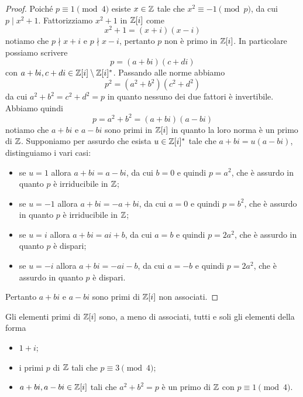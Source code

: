 \documentclass[11pt]{scrartcl}
\begin{document}
	\begin{proof}
		Poiché $p \equiv 1 \pmod 4$ esiste $x \in \mathbb Z$ tale che $x^2 \equiv -1 \pmod p$,
		da cui $p \mid x^2 + 1$. Fattorizziamo $x^2 + 1$ in $\mathbb Z[i]$ come 
		\[
		x^2 + 1 = (x + i)(x - i)
		\]
		notiamo che $p\nmid x + i$ e $p \nmid x - i$, pertanto $p$ non è primo in $\mathbb Z[i]$.
		In particolare possiamo scrivere 
		\[
		p = (a + bi)(c + di)
		\]
		con $a + bi, c + di \in \mathbb Z[i] \setminus \mathbb Z[i]^*$. Passando alle norme 
		abbiamo
		\[
		p^2 = (a^2 + b^2)(c^2 + d^2)
		\]
		da cui $a^2 + b^2 = c^2 + d^2 = p$ in quanto nessuno dei due fattori è 
		invertibile. Abbiamo quindi 
		\[
		p = a^2 + b^2 = (a + bi)(a - bi)
		\]
		notiamo che $a + bi$ e $a - bi$ sono primi in $\mathbb Z[i]$ in quanto la loro 
		norma è un primo di $\mathbb Z$. Supponiamo per assurdo che esista $u \in \mathbb Z[i]^*$
		tale che $a + bi = u(a - bi)$, distinguiamo i vari casi:
		\begin{itemize}
			\item se $u = 1$ allora $a + bi = a - bi$, da cui $b = 0$ e quindi $p = a^2$,
			che è assurdo in quanto $p$ è irriducibile in $\mathbb Z$;
			\item se $u = -1$ allora $a + bi = -a + bi$, da cui $a = 0$ e quindi
			$p = b^2$, che è assurdo in quanto $p$ è irriducibile in $\mathbb Z$;
			\item se $u = i$ allora $a + bi = ai + b$, da cui $a = b$ e quindi $p = 
			2a^2$, che è assurdo in quanto $p$ è dispari;
			\item se $u = -i$ allora $a + bi = -ai - b$, da cui $a = -b$ e quindi
			$p = 2a^2$, che è assurdo in quanto $p$ è dispari.
		\end{itemize}
		Pertanto $a + bi$ e $a - bi$ sono primi di $\mathbb Z[i]$ non associati.
	\end{proof}
	
	\begin{proposition}
		Gli elementi primi di $\mathbb Z[i]$ sono, a meno di associati, tutti e soli
		gli elementi della forma
		\begin{itemize}
			\item $1 + i$;
			\item i primi $p$ di $\mathbb Z$ tali che $p \equiv 3 \pmod 4$;
			\item $a + bi, a - bi \in \mathbb Z[i]$ tali che $a^2 + b^2 = p$ è un primo
			di $\mathbb Z$ con $p \equiv 1 \pmod 4$.
		\end{itemize}
	\end{proposition}
	
\end{document}
